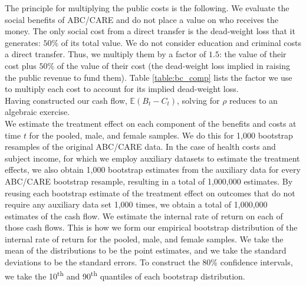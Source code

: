 \noindent The principle for multiplying the public costs is the following. We evaluate the social benefits of ABC/CARE and do not place a value on who receives the money. The only social cost from a direct transfer is the dead-weight loss that it generates: $50\%$ of its total value. We do not consider education and criminal costs a direct transfer. Thus, we multiply them by a factor of $1.5$: the value of their cost plus $50\%$ of the value of their cost (the dead-weight loss implied in raising the public revenue to fund them). Table \ref{table:bc_comp} lists the factor we use to multiply each cost to account for its implied dead-weight loss.\\

\noindent Having constructed our cash flow, $\mathbb{E} (B_t - C_t)$, solving for $\rho$
reduces to an algebraic exercise.\\

\noindent We estimate the treatment effect on each
component of the benefits and costs at time $t$ for the pooled, male, and
female samples. We do this for 1,000 bootstrap resamples of the original ABC/CARE data.
In the case of health costs and subject income, for which we employ auxiliary datasets to
estimate the treatment effects, we also obtain 1,000 bootstrap estimates from the auxiliary data
for every ABC/CARE bootstrap resample, resulting in a total of 1,000,000 estimates.
By reusing each bootstrap estimate of the treatment effect on outcomes that do not require any auxiliary data
set 1,000 times, we obtain a total of 1,000,000 estimates of the cash flow.
We estimate the internal rate of return on each of those cash flows.
This is how we form our empirical bootstrap distribution of the internal rate of return for the pooled, male, and female samples.
We take the mean of the distributions to be the point estimates, and we take the standard deviations
to be the standard errors. To construct the 80\% confidence intervals, we take the 10\textsuperscript{th}
and 90\textsuperscript{th} quantiles of each bootstrap distribution. \\




